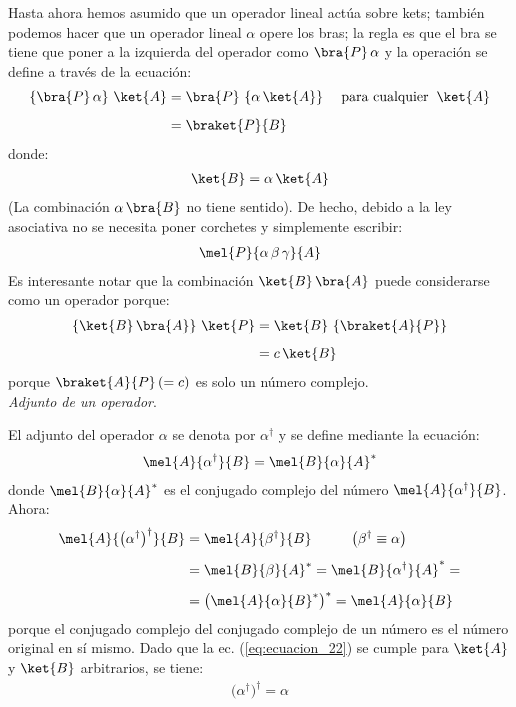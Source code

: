 Hasta ahora hemos asumido que un operador lineal actúa sobre kets; también podemos hacer que un operador lineal $\alpha$ opere los bras; la regla es que el bra se tiene que poner a la izquierda del operador como $\bra{P}  \, \alpha$ y la operación se define a través de la ecuación:
\begin{align*}
\left\{ \bra{P} \, \alpha \right\} \, \ket{A} &= \bra{P} \, \left\{ \alpha \, \ket{A} \right\} \hspace{0.4cm} \mbox{para cualquier} \hspace{0.2cm} \ket{A} \\[0.5em]
&= \braket{P}{B}
\end{align*}
donde:
\begin{align*}
\ket{B} = \alpha \, \ket{A}
\end{align*}
(La combinación $\alpha \, \bra{B}$ no tiene sentido). De hecho, debido a la ley asociativa no se necesita poner corchetes y simplemente escribir:
\begin{align*}
\mel{P}{\alpha \, \beta \, \gamma}{A}
\end{align*}
Es interesante notar que la combinación $\ket{B} \, \bra{A}$ puede considerarse como un operador porque:
\begin{align*}
\left\{ \ket{B} \, \bra{A} \right\} \, \ket{P} &= \ket{B} \, \left\{ \braket{A}{P} \right\} \\[0.5em]
&= c \, \ket{B}
\end{align*}
porque $\braket{A}{P} \, (= c)$ es solo un número complejo.
\\[0.5em]
\emph{Adjunto de un operador}.

El adjunto del operador $\alpha$ se denota por $\alpha^{\dagger}$ y se define mediante la ecuación:
\begin{align}
\mel{A}{\alpha^{\dagger}}{B} = \mel{B}{\alpha}{A}^{*}
\label{eq:ecuacion_21}
\end{align}
donde $\mel{B}{\alpha}{A}^{*}$ es el conjugado complejo del número $\mel{A}{\alpha^{\dagger}}{B}$. Ahora:
\begin{align}
\begin{aligned}[b]
\mel{A}{\big( \alpha^{\dagger} \big)^{\dagger}}{B} &= \mel{A}{\beta^{\dagger}}{B} \hspace{1cm} \big( \beta^{\dagger} \equiv \alpha \big) \\[0.5em]
&= \mel{B}{\beta}{A}^{*} = \mel{B}{\alpha^{\dagger}}{A}^{*} = \\[0.5em]
&= \big( \mel{A}{\alpha}{B}^{*} \big)^{*} = \mel{A}{\alpha}{B}
\end{aligned}
\label{eq:ecuacion_22}
\end{align}
porque el conjugado complejo del conjugado complejo de un número es el número original en sí mismo. Dado que la ec. (\ref{eq:ecuacion_22}) se cumple para $\ket{A}$ y $\ket{B}$ arbitrarios, se tiene:
\begin{align}
\big( \alpha^{\dagger} \big)^{\dagger} = \alpha
\label{eq:ecuacion_23}
\end{align}

